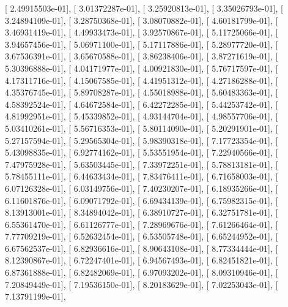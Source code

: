 \documentclass{article}
\begin{document}
       [  2.49915503e-01],
       [  3.01372287e-01],
       [  3.25920813e-01],
       [  3.35026793e-01],
       [  3.24894109e-01],
       [  3.28750368e-01],
       [  3.08070882e-01],
       [  4.60181799e-01],
       [  3.46931419e-01],
       [  4.49933473e-01],
       [  3.92570867e-01],
       [  5.11725066e-01],
       [  3.94657456e-01],
       [  5.06971100e-01],
       [  5.17117886e-01],
       [  5.28977720e-01],
       [  3.67536391e-01],
       [  3.65670588e-01],
       [  3.86238406e-01],
       [  3.87271619e-01],
       [  5.30396888e-01],
       [  4.04171977e-01],
       [  4.00921830e-01],
       [  5.76717597e-01],
       [  4.17311716e-01],
       [  4.15067585e-01],
       [  4.41951312e-01],
       [  4.27186288e-01],
       [  4.35376745e-01],
       [  5.89708287e-01],
       [  4.55018988e-01],
       [  5.60483363e-01],
       [  4.58392524e-01],
       [  4.64672584e-01],
       [  6.42272285e-01],
       [  5.44253742e-01],
       [  4.81992951e-01],
       [  5.45339852e-01],
       [  4.93144704e-01],
       [  4.98557706e-01],
       [  5.03410261e-01],
       [  5.56716353e-01],
       [  5.80114090e-01],
       [  5.20291901e-01],
       [  5.27157594e-01],
       [  5.29565304e-01],
       [  5.98390318e-01],
       [  7.17723354e-01],
       [  5.43098835e-01],
       [  6.92774162e-01],
       [  5.53551954e-01],
       [  7.22940566e-01],
       [  7.47975928e-01],
       [  5.63503445e-01],
       [  7.33972251e-01],
       [  5.78813181e-01],
       [  5.78455111e-01],
       [  6.44633434e-01],
       [  7.83476411e-01],
       [  6.71658003e-01],
       [  6.07126328e-01],
       [  6.03149756e-01],
       [  7.40230207e-01],
       [  6.18935266e-01],
       [  6.11601876e-01],
       [  6.09071792e-01],
       [  6.69434139e-01],
       [  6.75982315e-01],
       [  8.13913001e-01],
       [  8.34894042e-01],
       [  6.38910727e-01],
       [  6.32751781e-01],
       [  6.55361470e-01],
       [  6.61126777e-01],
       [  7.28969676e-01],
       [  7.61266464e-01],
       [  7.77709219e-01],
       [  6.52632454e-01],
       [  6.53505748e-01],
       [  6.65244952e-01],
       [  6.67562537e-01],
       [  6.82936616e-01],
       [  8.90643108e-01],
       [  8.77334444e-01],
       [  8.12390867e-01],
       [  6.72247401e-01],
       [  6.94567493e-01],
       [  6.82451821e-01],
       [  6.87361888e-01],
       [  6.82482069e-01],
       [  6.97093202e-01],
       [  8.09310946e-01],
       [  7.20849449e-01],
       [  7.19536150e-01],
       [  8.20183629e-01],
       [  7.02253043e-01],
       [  7.13791199e-01],
\end{document}
